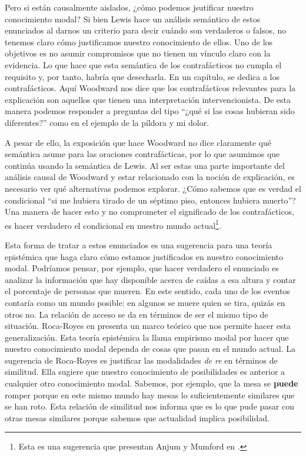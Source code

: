 Pero si están causalmente aislados, ¿cómo podemos jsutificar nuestro conocimiento modal? Si bien Lewis hace un análisis semántico de estos enunciados al darnos un criterio para decir cuándo son verdaderos o falsos, no tenemos claro cómo justificamos nuestro conocimiento de ellos. Uno de los objetivos es no asumir compromisos que no tienen un vínculo claro con la evidencia. Lo que hace que esta semántica de los contrafácticos no cumpla el requisito y, por tanto, habría que desecharla. En un capítulo, \cite[cap. 5]{Woodward2003} se dedica a los contrafácticos. Aquí Woodward nos dice que los contrafácticos relevantes para la explicación son aquellos que tienen una interpretación intervencionista. De esta manera podemos responder a preguntas del tipo ``¿qué si las cosas hubieran sido diferentes?'' como en el ejemplo de la píldora y mi dolor.

A pesar de ello, la exposición que hace Woodward no dice claramente qué semántica asume para las oraciones contrafácticas, por lo que asumimos que continúa usando la semántica de Lewis. Al ser estas una parte importante del análisis causal de Woodward y estar relacionado con la noción de explicación, es necesario ver qué alternativas podemos explorar. ¿Cómo sabemos que es verdad el condicional ``si me hubiera tirado de un séptimo piso, entonces hubiera muerto''? Una manera de hacer esto y no comprometer el significado de los contrafácticos, es hacer verdadero el condicional en nuestro mundo actual\footnote{Esta es una sugerencia que presentan Anjum y Mumford en \cite{Mumford2013}.}.

Esta forma de tratar a estos enunciados es una sugerencia para una teoría epistémica que haga claro cómo estamos justificados en nuestro conocimiento modal. Podríamos pensar, por ejemplo, que hacer verdadero el enunciado es analizar la información que hay disponible acerca de caídas a esa altura y contar el porcentaje de personas que mueren. En este sentido, cada uno de los eventos contaría como un mundo posible: en algunos se muere quien se tira, quizás en otros no. La relación de acceso se da en términos de ser el mismo tipo de situación. Roca-Royes en \citeyear{rocaroyes} presenta un marco teórico que nos permite hacer esta generalización. Esta teoría epistémica la llama empirismo modal por hacer que nuestro conocimiento modal dependa de cosas que pasan en el mundo actual. La sugerencia de Roca-Royes es justificar las modalidades \textit{de re} en términos de similitud. Ella sugiere que nuestro conocimiento de posibilidades es anterior a cualquier otro conocimiento modal. Sabemos, por ejemplo, que la mesa se \textbf{puede} romper porque en este mismo mundo hay mesas lo suficientemente similares que se han roto. Esta relación de similitud nos informa que es lo que pude pasar con otras mesas similares porque sabemos que actualidad implica posibilidad.

